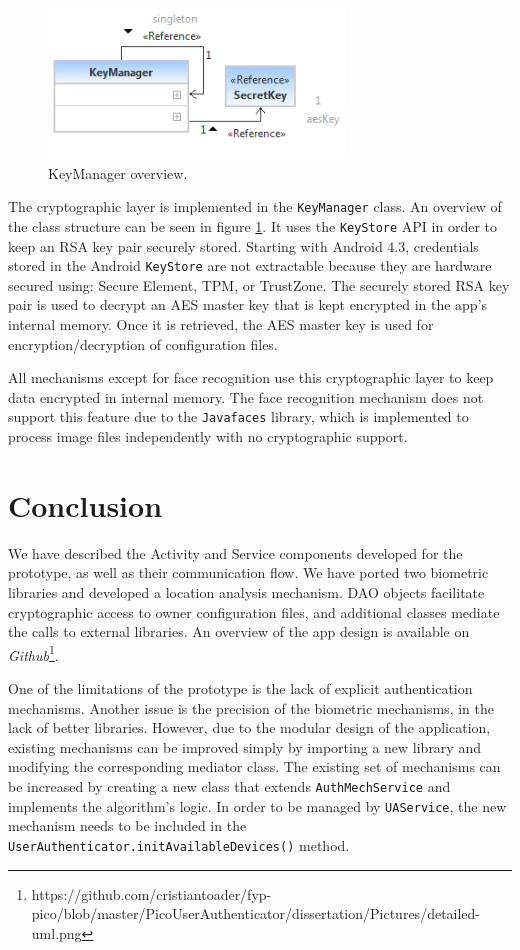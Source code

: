 \begin{figure}[h]
    \centering
    \includegraphics[width=0.7\textwidth]{Pictures/keymanager-brief}
    \caption{KeyManager overview.}
    \label{fig:keymanager}
\end{figure}
The cryptographic layer is implemented in the {\tt KeyManager} class. An overview of the class structure can be seen in figure \ref{fig:keymanager}. It uses the {\tt KeyStore} API in order to keep an RSA key pair securely stored. Starting with Android 4.3, credentials stored in the Android {\tt KeyStore} are not extractable because they are hardware secured using: Secure Element, TPM, or TrustZone. The securely stored RSA key pair is used to decrypt an AES master key that is kept encrypted in the app's internal memory. Once it is retrieved, the AES master key is used for encryption/decryption of configuration files.

All mechanisms except for face recognition use this cryptographic layer to keep data encrypted in internal memory. The face recognition mechanism does not support this feature due to the {\tt Javafaces} library, which is implemented to process image files independently with no cryptographic support. 

\section{Conclusion}
We have described the Activity and Service components developed for the prototype, as well as their communication flow. We have ported two biometric libraries and developed a location analysis mechanism. DAO objects facilitate cryptographic access to owner configuration files, and additional classes mediate the calls to external libraries. An overview of the app design is available on {\em Github}\footnote{https://github.com/cristiantoader/fyp-pico/blob/master/PicoUserAuthenticator/dissertation/Pictures/detailed-uml.png}.

One of the limitations of the prototype is the lack of explicit authentication mechanisms. Another issue is the precision of the biometric mechanisms, in the lack of better libraries. However, due to the modular design of the application, existing mechanisms can be improved simply by importing a new library and modifying the corresponding mediator class. The existing set of mechanisms can be increased by creating a new class that extends {\tt AuthMechService} and implements the algorithm's logic. In order to be managed by {\tt UAService}, the new mechanism needs to be included in the {\tt UserAuthenticator.initAvailableDevices()} method.

